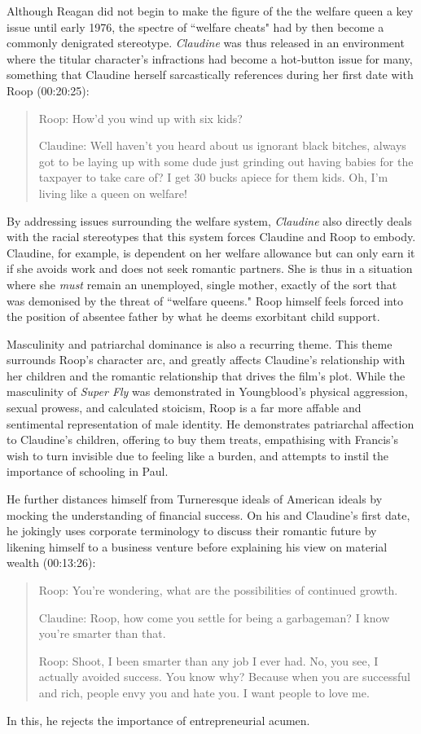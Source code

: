Although Reagan did not begin to make the figure of the the welfare queen a key issue until early 1976, the spectre of ``welfare cheats" had by then become a commonly denigrated stereotype.\autocite[][]{noauthor_welfare_1976}
\textit{Claudine} was thus released in an environment where the titular character's infractions had become a hot-button issue for many, something that Claudine herself sarcastically references during her first date with Roop (00:20:25):
\begin{quote}
Roop: How'd you wind up with six kids?

Claudine: Well haven't you heard about us ignorant black bitches, always got to be laying up with some dude just grinding out having babies for the taxpayer to take care of? I get 30 bucks apiece for them kids. Oh, I'm living like a queen on welfare!
\end{quote}
By addressing issues surrounding the welfare system, \textit{Claudine} also directly deals with the racial stereotypes that this system forces Claudine and Roop to embody.
Claudine, for example, is dependent on her welfare allowance but can only earn it if she avoids work and does not seek romantic partners.
She is thus in a situation where she \textit{must} remain an unemployed, single mother, exactly of the sort that was demonised by the threat of ``welfare queens."
Roop himself feels forced into the position of absentee father by what he deems exorbitant child support.

Masculinity and patriarchal dominance is also a recurring theme.
This theme surrounds Roop's character arc, and greatly affects Claudine’s relationship with her children and the romantic relationship that drives the film’s plot.
While the masculinity of \textit{Super Fly} was demonstrated in Youngblood's physical aggression, sexual prowess, and calculated stoicism, Roop is a far more affable and sentimental representation of male identity.
He demonstrates patriarchal affection to Claudine's children, offering to buy them treats, empathising with Francis's wish to turn invisible due to feeling like a burden, and attempts to instil the importance of schooling in Paul.

He further distances himself from Turneresque ideals of American ideals by mocking the understanding of financial success.
On his and Claudine's first date, he jokingly uses corporate terminology to discuss their romantic future by likening himself to a business venture before explaining his view on material wealth (00:13:26):
\begin{quote}
Roop: You're wondering, what are the possibilities of continued growth.

Claudine: Roop, how come you settle for being a garbageman? I know you're smarter than that.

Roop: Shoot, I been smarter than any job I ever had. No, you see, I actually avoided success. You know why? Because when you are successful and rich, people envy you and hate you. I want people to love me.    
\end{quote}
In this, he rejects the importance of entrepreneurial acumen.

